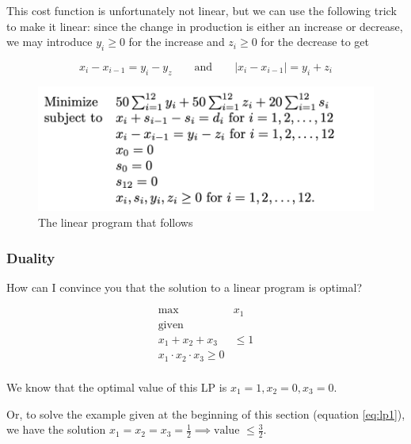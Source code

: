 \documentclass[../notes.tex]{subfiles}
\begin{document}
This cost function is unfortunately not linear, but we can use the following trick to make it linear: since the change in production is either an increase or decrease, we may introduce $ y_i \ge  0 $ for the increase and $ z_i \ge 0 $ for the decrease to get

\begin{equation}
    x_i - x_{i-1} = y_i - y_z \qquad \text{and} \qquad |x_i - x_{i-1}| = y_i + z_i
\end{equation}

\begin{figure}[H]
    \centering
    \includegraphics[width=0.8\linewidth]{img/image_2023-03-08-16-54-39.png}
    \caption{The linear program that follows}
\end{figure}










\subsubsection{Duality}

How can I convince you that the solution to a linear program is optimal?


\begin{equation}
    \begin{split}
        \max &  x_1 \\
        \text{given} &\\
        x_1 + x_2 + x_3 &\le  1 \\
        x_1 \cdot  x_2 \cdot  x_3 \ge  0 \\
    \end{split}
\end{equation}

We know that the optimal value of this LP is $ x_1 = 1, x_2 = 0, x_3 = 0 $.

Or, to solve the example given at the beginning of this section (equation \ref{eq:lp1}), we have the solution $ x_1 = x_2 = x_3 = \frac{1}{2} \implies \text{value } \le  \frac{3}{2} $.
\end{document}
